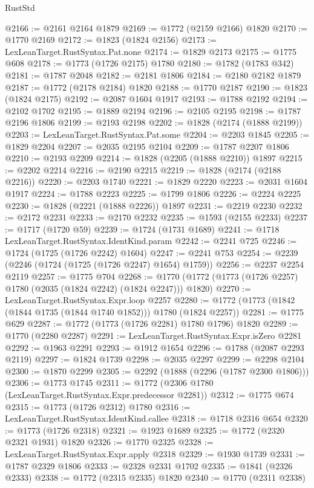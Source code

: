 \begin{lexlean}{RustStd}
\begin{coremodule}
@2166 := @2161 @2164 @1879
@2169 := @1772 (@2159 @2166) @1820
@2170 := @1770 @2169
@2172 := @1823 (@1824 @2156)
@2173 := LexLeanTarget.RustSyntax.Pat.none
@2174 := @1829 @2173
@2175 := @1775 @608
@2178 := @1773 (@1726 @2175) @1780
@2180 := @1782 (@1783 @342)
@2181 := @1787 @2048
@2182 := @2181 @1806
@2184 := @2180 @2182 @1879
@2187 := @1772 (@2178 @2184) @1820
@2188 := @1770 @2187
@2190 := @1823 (@1824 @2175)
@2192 := @2087 @1604 @1917
@2193 := @1788 @2192
@2194 := @2102 @1702
@2195 := @1889 @2194
@2196 := @2105 @2195
@2198 := @1787 @2196 @1806
@2199 := @2193 @2198
@2202 := @1828 (@2174 (@1888 @2199))
@2203 := LexLeanTarget.RustSyntax.Pat.some
@2204 := @2203 @1845
@2205 := @1829 @2204
@2207 := @2035 @2195 @2104
@2209 := @1787 @2207 @1806
@2210 := @2193 @2209
@2214 := @1828 (@2205 (@1888 @2210)) @1897
@2215 := @2202 @2214
@2216 := @2190 @2215
@2219 := @1828 (@2174 (@2188 @2216))
@2220 := @2203 @1740
@2221 := @1829 @2220
@2223 := @2031 @1604 @1917
@2224 := @1788 @2223
@2225 := @1799 @1806
@2226 := @2224 @2225
@2230 := @1828 (@2221 (@1888 @2226)) @1897
@2231 := @2219 @2230
@2232 := @2172 @2231
@2233 := @2170 @2232
@2235 := @1593 (@2155 @2233)
@2237 := @1717 (@1720 @59)
@2239 := @1724 (@1731 @1689)
@2241 := @1718 LexLeanTarget.RustSyntax.IdentKind.param
@2242 := @2241 @725
@2246 := @1724 (@1725 (@1726 @2242) @1604)
@2247 := @2241 @753
@2254 := @2239 (@2246 (@1724 (@1725 (@1726 @2247) @1654) @1759))
@2256 := @2237 @2254 @2119
@2257 := @1775 @704
@2268 := @1770 (@1772 (@1773 (@1726 @2257) @1780 (@2035 (@1824 @2242) (@1824 @2247))) @1820)
@2270 := LexLeanTarget.RustSyntax.Expr.loop @2257
@2280 := @1772 (@1773 (@1842 (@1844 @1735 (@1844 @1740 @1852))) @1780 (@1824 @2257))
@2281 := @1775 @629
@2287 := @1772 (@1773 (@1726 @2281) @1780 @1796) @1820
@2289 := @1770 (@2280 @2287)
@2291 := LexLeanTarget.RustSyntax.Expr.isZero @2281
@2292 := @1963 @2291
@2293 := @1912 @1654
@2296 := @1788 (@2087 @2293 @2119)
@2297 := @1824 @1739
@2298 := @2035 @2297
@2299 := @2298 @2104
@2300 := @1870 @2299
@2305 := @2292 (@1888 (@2296 (@1787 @2300 @1806)))
@2306 := @1773 @1745
@2311 := @1772 (@2306 @1780 (LexLeanTarget.RustSyntax.Expr.predecessor @2281))
@2312 := @1775 @674
@2315 := @1773 (@1726 @2312) @1780
@2316 := LexLeanTarget.RustSyntax.IdentKind.callee
@2318 := @1718 @2316 @654
@2320 := @1773 (@1726 @2318)
@2321 := @1923 @1689
@2325 := @1772 (@2320 @2321 @1931) @1820
@2326 := @1770 @2325
@2328 := LexLeanTarget.RustSyntax.Expr.apply @2318
@2329 := @1930 @1739
@2331 := @1787 @2329 @1806
@2333 := @2328 @2331 @1702
@2335 := @1841 (@2326 @2333)
@2338 := @1772 (@2315 @2335) @1820
@2340 := @1770 (@2311 @2338)

\end{coremodule}
\end{lexlean}
